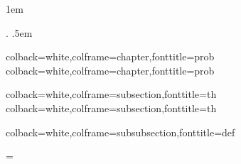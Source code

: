   {\topsep}         %
  {\topsep}         %
  {}                %
  {}                %
  {\bfseries}       %
  {\newline}        %
  {1em}             %
  {}                %

\theoremstyle{boldnewline}
\newtheorem{problem}{Problem}

{}
{}
{\upshape}
{}
{\bfseries}
{.}
{.5em}
{}
\theoremstyle{customthm}
\newtheorem{theorem}{Theorem}[chapter]
\newtheorem{definition}{Definition}[chapter]

%
{colback=white,colframe=chapter,fonttitle=\bfseries}{prob}
%
{colback=white,colframe=chapter,fonttitle=\bfseries}{prob}

%
{colback=white,colframe=subsection,fonttitle=\bfseries}{th}
%
{colback=white,colframe=subsection,fonttitle=\bfseries}{th}

%
{colback=white,colframe=subsubsection,fonttitle=\bfseries}{def}

\newtheorem*{researchq}{Research Question}
\newtheorem*{subsidiaryq}{Subsidiary Questions}

\usetikzlibrary{intersections, arrows.meta, calc}

\usepackage{pgf}
\usepackage{pgfplots}
\pgfplotsset{compat=1.14}
\usepackage{import}
\def\mathdefault#1{#1}
\everymath=\expandafter{\the\everymath\displaystyle}

\newif\ifshowcomments
\showcommentstrue
\ifshowcomments
    \newcommand{\mynote}[2]{\fbox{\bfseries\sffamily\scriptsize{#1}}
        {\small$\blacktriangleright$\textsf{\emph{#2}}$\blacktriangleleft$}}
    \newcommand{\citehere}[0]{\textcolor{red}{\fbox{\bfseries\sffamily\scriptsize{CITATION}}}}
\else
    \newcommand{\mynote}[2]{}
    \newcommand{\citehere}[0]{}
\fi
\newcommand{\todo}[1]{\textcolor{blue}{\mynote{To do}{#1}}}

\usepackage{subfiles}

\newcommand{\onlyinsubfile}[1]{#1}
\newcommand{\notinsubfile}[1]{}

\usepackage[backend=biber,style=numeric,sortcites,sorting=nty,backref,natbib,hyperref]{biblatex}


